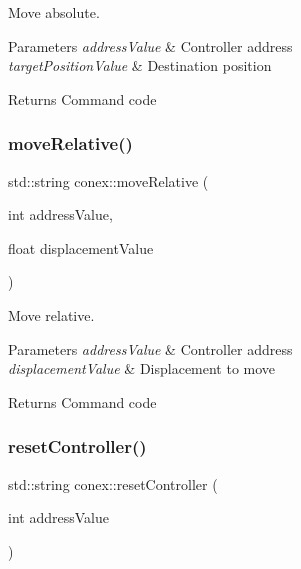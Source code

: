 Move absolute. 


\begin{DoxyParams}{Parameters}
{\em address\+Value} & Controller address \\
\hline
{\em target\+Position\+Value} & Destination position \\
\hline
\end{DoxyParams}
\begin{DoxyReturn}{Returns}
Command code 
\end{DoxyReturn}
\mbox{\label{namespaceconex_a6728914e77941e2fb4483b6721785ffb}} 
\subsubsection{\texorpdfstring{move\+Relative()}{moveRelative()}}
{\footnotesize\ttfamily std\+::string conex\+::move\+Relative (\begin{DoxyParamCaption}\item[{int}]{address\+Value,  }\item[{float}]{displacement\+Value }\end{DoxyParamCaption})}



Move relative. 


\begin{DoxyParams}{Parameters}
{\em address\+Value} & Controller address \\
\hline
{\em displacement\+Value} & Displacement to move \\
\hline
\end{DoxyParams}
\begin{DoxyReturn}{Returns}
Command code 
\end{DoxyReturn}
\mbox{\label{namespaceconex_ac817039b6d386eae2ff9b288bee8c8f6}} 
\subsubsection{\texorpdfstring{reset\+Controller()}{resetController()}}
{\footnotesize\ttfamily std\+::string conex\+::reset\+Controller (\begin{DoxyParamCaption}\item[{int}]{address\+Value }\end{DoxyParamCaption})}




